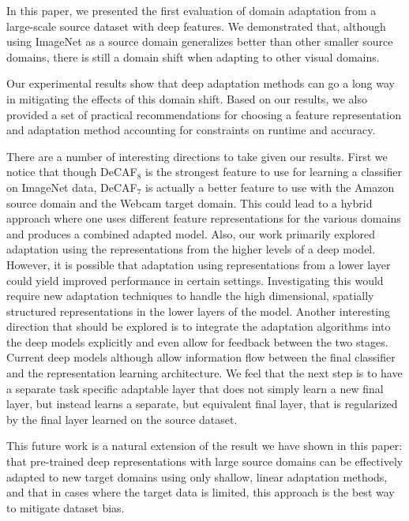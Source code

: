 In this paper, we presented the first evaluation of domain adaptation from a
large-scale source dataset with deep features. We demonstrated that, although using ImageNet as a
source domain generalizes better than other smaller source domains, there is
still a domain shift when adapting to other visual domains.

Our experimental results show that deep adaptation methods can go a long
way in mitigating the effects of this domain shift. Based on our results, we
also provided a set of practical recommendations for choosing a feature
representation and adaptation method accounting for constraints on runtime and
accuracy.

There are a number of interesting directions to take given our results. First we
notice that though DeCAF$_8$ is the strongest feature to use for learning a
classifier on ImageNet data, DeCAF$_7$ is actually a better feature to use with
the Amazon source domain and the Webcam target domain. This could lead to a
hybrid approach where one uses different feature representations for the various
domains and produces a combined adapted model. Also, our work primarily explored
adaptation using the representations from the higher levels of a deep
model. However, it is possible that adaptation using representations from a
lower layer could yield improved performance in certain settings. Investigating
this would require new adaptation techniques to handle the high dimensional,
spatially structured representations in the lower layers of the model. Another
interesting direction that should be explored is to integrate the adaptation
algorithms into the deep models explicitly and even allow for feedback between
the two stages. Current deep models although allow information flow between the
final classifier and the representation learning architecture. We feel that the
next step is to have a separate task specific adaptable layer that does not
simply learn a new final layer, but instead learns a separate, but equivalent
final layer, that is regularized by the final layer learned on the source
dataset.

This future work is a natural extension of the result we have shown in this
paper: that pre-trained deep representations with large source domains can be
effectively adapted to new target domains using only shallow, linear adaptation
methods, and that in cases where the target data is limited, this approach is
the best way to mitigate dataset bias.
